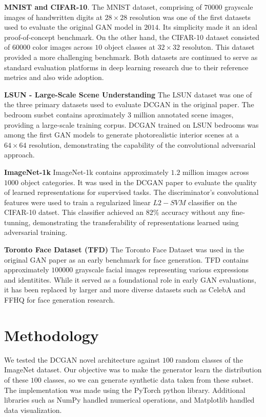 \documentclass[twocolumn]{article}
\begin{document}
\textbf{MNIST and CIFAR-10}. \cite{lecun1998gradient} \cite{krizhevsky2009learning} The MNIST dataset, comprising of $70 000$ grayscale images of handwritten digits
at $28 \times 28$ resolution was one of the first datasets used to evaluate the original GAN model in $2014$.
Its simplicity made it an ideal proof-of-concept benchmark. On the other hand, the CIFAR-10 dataset consisted
of $60 000$ color images across $10$ object classes at $32 \times 32$ resoluton. This dataset provided a more
challenging benchmark. Both datasets are continued to serve as standard evaluation platforms in deep learning research
due to their reference metrics and also wide adoption.

\textbf{LSUN - Large-Scale Scene Understanding} \cite{yu2015lsun} The LSUN dataset was one of the three primary datasets
used to evaluate DCGAN in the original paper. The bedroom susbet contains aproximately 3 million annotated
scene images, providing a large-scale training corpus. DCGAN trained on LSUN bedrooms was among the first GAN
models to generate photorealistic interior scenes at a $64 \times 64$ resolution, demonstrating the capability
of the convolutional adversarial approach.

\textbf{ImageNet-1k} \cite{russakovsky2014imagenet} ImageNet-1k contains approximately $1.2$ million images across $1000$ object categories. It was used
in the DCGAN paper to evaluate the quality of learned representations for supervised tasks. The discriminator's convolutional
features were used to train a regularized linear $L2-SVM$ classifier on the CIFAR-10 datset. This classifier achieved
an $82\%$ accuracy without any fine-tunning, demonstrating the transferability of representations learned using adversarial
training.

\textbf{Toronto Face Dataset (TFD)} \cite{susskind2010tfd} The Toronto Face Dataset was used in the original GAN paper as an early benchmark
for face generation. TFD contains approximately $100000$ grayscale facial images representing various expressions
and identitites. While it served as a foundational role in early GAN evaluations, it has been replaced by larger and
more diverse datasets such as CelebA and FFHQ for face generation research.

\section{Methodology}

We tested the DCGAN novel architecture against $100$ random classes of the ImageNet dataset. Our objective was to make
the generator learn the distribution of these $100$ classes, so we can generate synthetic data taken from these subset.
The implementation was made using the PyTorch python library. Additional libraries such as NumPy handled numerical operations,
and Matplotlib handled data visualization.
\end{document}
